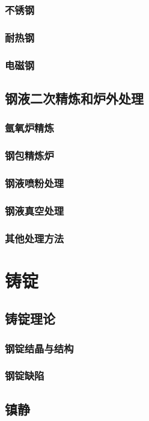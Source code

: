 \documentclass[UTF8]{../../ApplicationUniverse}
\begin{document}
        \subsubsection{不锈钢}
        \subsubsection{耐热钢}
        \subsubsection{电磁钢}
    \subsection{钢液二次精炼和炉外处理}
        \subsubsection{氩氧炉精炼}
        \subsubsection{钢包精炼炉}
        \subsubsection{钢液喷粉处理}
        \subsubsection{钢液真空处理}
        \subsubsection{其他处理方法}
\section{铸锭}
    \subsection{铸锭理论}
        \subsubsection{钢锭结晶与结构}
        \subsubsection{钢锭缺陷}
    \subsection{镇静}
\end{document}
